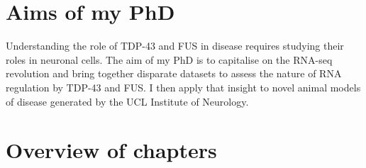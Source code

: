 %
%
%
%
%
%
%



\section{Aims of my PhD} 



Understanding the role of TDP-43 and FUS in disease requires studying their roles in neuronal cells.
The aim of my PhD is to capitalise on the RNA-seq revolution and bring together disparate datasets to assess the nature of RNA regulation by TDP-43 and FUS.
I then apply that insight to novel animal models of disease generated by the UCL Institute of Neurology.


\section{Overview of chapters}

